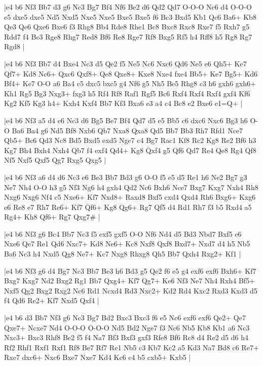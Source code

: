 \whitename{}
\blackname{}
\makegametitle
|e4 b6 Nf3 Bb7 d3 g6 Nc3 Bg7 Bf4 Nf6 Be2 d6 Qd2 Qd7 O-O-O Nc6 d4 O-O-O e5 dxe5 dxe5 Nd5 Nxd5 Nxe5 Nxe5 Bxe5 Bxe5 f6 Bc3 Bxd5 Kb1 Qc6 Ba6+ Kb8 Qe3 Qe6 Qxe6 Bxe6 f3 Rhg8 Bb4 Rde8 Rhe1 Bc8 Bxc8 Rxc8 Rxe7 f5 Rxh7 g5 Rdd7 f4 Bc3 Rge8 Rhg7 Red8 Bf6 Re8 Rge7 Rf8 Bxg5 Rf5 h4 Rff8 h5 Rg8 Rg7 Rgd8  |

\whitename{}
\blackname{}
\makegametitle
|e4 b6 Nf3 Bb7 d4 Bxe4 Nc3 d5 Qe2 f5 Ne5 Nc6 Nxc6 Qd6 Ne5 e6 Qh5+ Ke7 Qf7+ Kd8 Nc6+ Qxc6 Qxf8+ Qe8 Qxe8+ Kxe8 Nxe4 fxe4 Bb5+ Ke7 Bg5+ Kd6 Bf4+ Ke7 O-O a6 Ba4 c5 dxc5 bxc5 g4 Nf6 g5 Nh5 Be5 Rhg8 c3 h6 gxh6 gxh6+ Kh1 Rg5 Bg3 Nxg3+ fxg3 h5 Rf4 Rf8 Raf1 Rgf5 Bc6 Rxf4 Rxf4 Rxf4 gxf4 Kf6 Kg2 Kf5 Kg3 h4+ Kxh4 Kxf4 Bb7 Kf3 Bxa6 e3 a4 c4 Bc8 e2 Bxe6 e1=Q+  |

\whitename{}
\blackname{}
\makegametitle
|e4 b6 Nf3 a5 d4 e6 Nc3 d6 Bg5 Be7 Bf4 Qd7 d5 e5 Bb5 c6 dxc6 Nxc6 Bg3 h6 O-O Ba6 Ba4 g6 Nd5 Bf8 Nxb6 Qb7 Nxa8 Qxa8 Qd5 Bb7 Bb3 Rh7 Rfd1 Nce7 Qb5+ Bc6 Qd3 Nc8 Bd5 Bxd5 exd5 Nge7 c4 Bg7 Rac1 Kf8 Rc2 Kg8 Re2 Bf6 h3 Kg7 Bh4 Bxh4 Nxh4 Qb7 f4 exf4 Qd4+ Kg8 Qxf4 g5 Qf6 Qd7 Re4 Qe8 Rg4 Qf8 Nf5 Nxf5 Qxf5 Qg7 Rxg5 Qxg5  |

\whitename{}
\blackname{}
\makegametitle
|e4 b6 Nf3 a6 d4 d6 Nc3 e6 Be3 Bb7 Bd3 g6 O-O f5 e5 d5 Re1 h6 Ne2 Bg7 g3 Ne7 Nh4 O-O h3 g5 Nf3 Ng6 h4 gxh4 Qd2 Nc6 Bxh6 Nce7 Bxg7 Kxg7 Nxh4 Rh8 Nxg6 Nxg6 Nf4 c5 Nxe6+ Kf7 Nxd8+ Raxd8 Bxf5 cxd4 Qxd4 Rh6 Bxg6+ Kxg6 e6 Re8 e7 Rh7 Re6+ Kf7 Qf6+ Kg8 Qg6+ Rg7 Qf5 d4 Rd1 Rh7 f3 b5 Rxd4 a5 Rg4+ Kh8 Qf6+ Rg7 Qxg7\#  |

\whitename{}
\blackname{}
\makegametitle
|e4 b6 Nf3 g6 Bc4 Bb7 Nc3 f5 exf5 gxf5 O-O Nf6 Nd4 d5 Bd3 Nbd7 Bxf5 e6 Nxe6 Qe7 Re1 Qd6 Nxc7+ Kd8 Ne6+ Kc8 Nxf8 Qxf8 Bxd7+ Nxd7 d4 h5 Nb5 Ba6 Nc3 h4 Nxd5 Qg8 Ne7+ Kc7 Nxg8 Rhxg8 Qh5 Bb7 Qxh4 Rxg2+ Kf1  |

\whitename{}
\blackname{}
\makegametitle
|e4 b6 Nf3 g6 d4 Bg7 Nc3 Bb7 Be3 h6 Bd3 g5 Qe2 f6 e5 g4 exf6 exf6 Bxh6+ Kf7 Bxg7 Kxg7 Nd2 Bxg2 Rg1 Bb7 Qxg4+ Kf7 Qg7+ Ke6 Nf3 Ne7 Nh4 Rxh4 Bf5+ Nxf5 Qg2 Bxg2 Rxg2 Nc6 Rd1 Ncxd4 Rd3 Nxc2+ Kd2 Rd4 Kxc2 Rxd3 Kxd3 d5 f4 Qd6 Re2+ Kf7 Nxd5 Qxf4  |

\whitename{}
\blackname{}
\makegametitle
|e4 b6 d3 Bb7 Nf3 g6 Nc3 Bg7 Bd2 Bxc3 Bxc3 f6 e5 Nc6 exf6 exf6 Qe2+ Qe7 Qxe7+ Ncxe7 Nd4 O-O-O O-O-O Nd5 Bd2 Nge7 f3 Nc6 Nb5 Kb8 Kb1 a6 Nc3 Nxc3+ Bxc3 Rhf8 Be2 f5 f4 Na7 Bf3 Bxf3 gxf3 Rfe8 Bf6 Rc8 d4 Re2 d5 d6 h4 Rf2 Rhf1 Rxf1 Rxf1 Rf8 Be7 Rf7 Re1 Nb5 c3 Kb7 Kc2 a5 Kd3 Na7 Bd8 c6 Re7+ Rxe7 dxc6+ Nxc6 Bxe7 Nxe7 Kd4 Kc6 c4 b5 cxb5+ Kxb5  |


